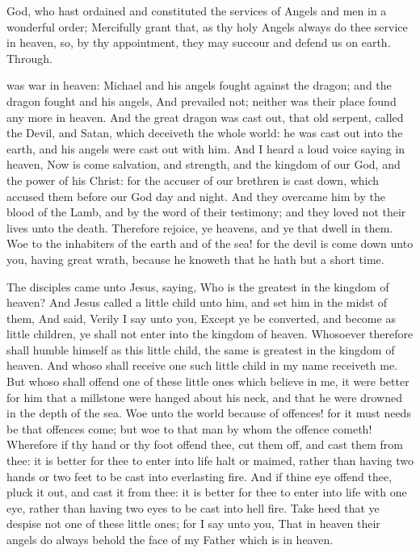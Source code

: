 \collect
{} God, who hast ordained and constituted the services of Angels and men in a wonderful order; Mercifully grant that, as thy holy Angels always do thee service in heaven, so, by thy appointment, they may succour and defend us on earth. Through.

 was war in heaven: Michael and his angels fought against the dragon; and the dragon fought and his angels, And prevailed not; neither was their place found any more in heaven. And the great dragon was cast out, that old serpent, called the Devil, and Satan, which deceiveth the whole world: he was cast out into the earth, and his angels were cast out with him. And I heard a loud voice saying in heaven, Now is come salvation, and strength, and the kingdom of our God, and the power of his Christ: for the accuser of our brethren is cast down, which accused them before our God day and night. And they overcame him by the blood of the Lamb, and by the word of their testimony; and they loved not their lives unto the death. Therefore rejoice, ye heavens, and ye that dwell in them. Woe to the inhabiters of the earth and of the sea! for the devil is come down unto you, having great wrath, because he knoweth that he hath but a short time.


 The disciples came unto Jesus, saying, Who is the greatest in the kingdom of heaven? And Jesus called a little child unto him, and set him in the midst of them, And said, Verily I say unto you, Except ye be converted, and become as little children, ye shall not enter into the kingdom of heaven. Whosoever therefore shall humble himself as this little child, the same is greatest in the kingdom of heaven. And whoso shall receive one such little child in my name receiveth me. But whoso shall offend one of these little ones which believe in me, it were better for him that a millstone were hanged about his neck, and that he were drowned in the depth of the sea. Woe unto the world because of offences! for it must needs be that offences come; but woe to that man by whom the offence cometh! Wherefore if thy hand or thy foot offend thee, cut them off, and cast them from thee: it is better for thee to enter into life halt or maimed, rather than having two hands or two feet to be cast into everlasting fire. And if thine eye offend thee, pluck it out, and cast it from thee: it is better for thee to enter into life with one eye, rather than having two eyes to be cast into hell fire. Take heed that ye despise not one of these little ones; for I say unto you, That in heaven their angels do always behold the face of my Father which is in heaven.

